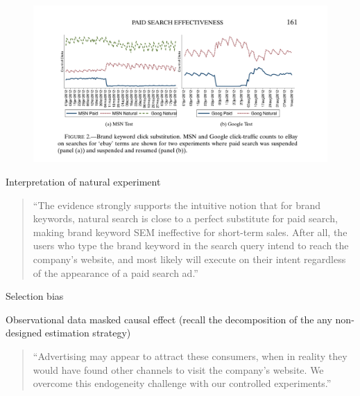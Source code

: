\documentclass{beamer}
\begin{document}
\begin{frame}

  \begin{figure}
    \begin{center}
      \includegraphics[scale=0.2]{./lecture_includes/tadelis_fig1.png}
    \end{center}
  \end{figure}

\end{frame}

\begin{frame}{Interpretation of natural experiment}

  \begin{quote}
    ``The evidence strongly supports the intuitive notion that for brand keywords, natural search is close to a perfect substitute for paid search, making brand keyword SEM ineffective for short-term sales.  After all, the users who type the brand keyword in the search query intend to reach the company's website, and most likely will execute on their intent regardless of the appearance of a paid search ad.''
  \end{quote}

\end{frame}

\begin{frame}{Selection bias}

  Observational data masked causal effect (recall the decomposition of the any non-designed estimation strategy)

  \bigskip

  \begin{quote}
    ``Advertising may appear to attract these consumers, when in reality they would have found other channels to visit the company's website.  We overcome this endogeneity challenge with our controlled experiments.''
  \end{quote}

\end{frame}
\end{document}
